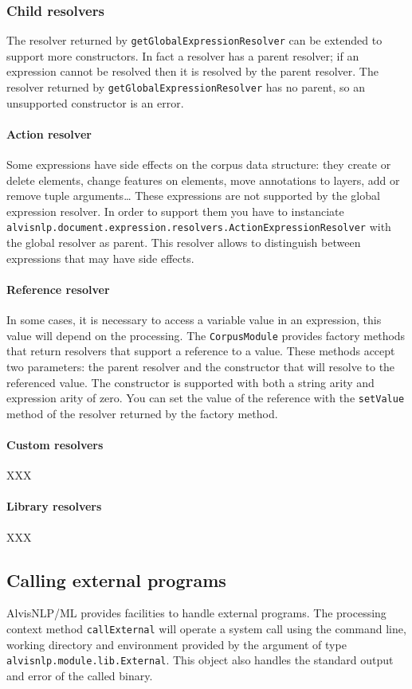\documentclass[a4paper]{article}
\begin{document}
\subsubsection{Child resolvers}
The resolver returned by \texttt{getGlobalExpressionResolver} can be extended to support more constructors.
In fact a resolver has a parent resolver; if an expression cannot be resolved then it is resolved by the parent resolver.
The resolver returned by \texttt{getGlobalExpressionResolver} has no parent, so an unsupported constructor is an error.

\paragraph{Action resolver}
Some expressions have side effects on the corpus data structure: they create or delete elements, change features on elements, move annotations to layers, add or remove tuple arguments\ldots
These expressions are not supported by the global expression resolver.
In order to support them you have to instanciate \texttt{alvisnlp.document.expression.resolvers.ActionExpressionResolver} with the global resolver as parent.
This resolver allows to distinguish between expressions that may have side effects.

\paragraph{Reference resolver}
In some cases, it is necessary to access a variable value in an expression, this value will depend on the processing.
The \texttt{CorpusModule} provides factory methods that return resolvers that support a reference to a value.
These methods accept two parameters: the parent resolver and the constructor that will resolve to the referenced value.
The constructor is supported with both a string arity and expression arity of zero.
You can set the value of the reference with the \texttt{setValue} method of the resolver returned by the factory method.

\paragraph{Custom resolvers}
XXX

\paragraph{Library resolvers}
XXX

\subsection{Calling external programs}
AlvisNLP/ML provides facilities to handle external programs.
The processing context method \texttt{callExternal} will operate a system call using the command line, working directory and environment provided by the argument of type \texttt{alvisnlp.module.lib.External}.
This object also handles the standard output and error of the called binary.
\end{document}
